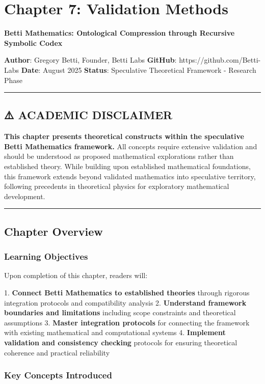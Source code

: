 \chapter{Chapter 7: Validation Methods}

\textbf{Betti Mathematics: Ontological Compression through Recursive Symbolic Codex}

\textbf{Author}: Gregory Betti, Founder, Betti Labs  
\textbf{GitHub}: https://github.com/Betti-Labs  
\textbf{Date}: August 2025  
\textbf{Status}: Speculative Theoretical Framework - Research Phase

\hrule

\section{⚠️ ACADEMIC DISCLAIMER}

\textbf{This chapter presents theoretical constructs within the speculative Betti Mathematics framework.} All concepts require extensive validation and should be understood as proposed mathematical explorations rather than established theory. While building upon established mathematical foundations, this framework extends beyond validated mathematics into speculative territory, following precedents in theoretical physics for exploratory mathematical development.

\hrule

\section{Chapter Overview}

\subsection{Learning Objectives}

Upon completion of this chapter, readers will:

1. \textbf{Connect Betti Mathematics to established theories} through rigorous integration protocols and compatibility analysis
2. \textbf{Understand framework boundaries and limitations} including scope constraints and theoretical assumptions
3. \textbf{Master integration protocols} for connecting the framework with existing mathematical and computational systems
4. \textbf{Implement validation and consistency checking} protocols for ensuring theoretical coherence and practical reliability

\subsection{Key Concepts Introduced}

